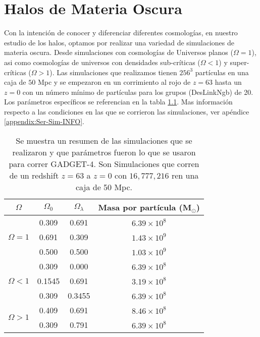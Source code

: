 \chapter{Halos de Materia Oscura}
\setcounter{equation}{0}

\noindent Con la intención de conocer y diferenciar diferentes cosmologías, en nuestro estudio de los halos, optamos por realizar una variedad de simulaciones de materia oscura. Desde simulaciones con cosmologías de Universos planos ($\Omega = 1$), asi como cosmologías  de universos con densidades sub-críticas ($\Omega < 1$) y super-críticas ($\Omega > 1$). Las simulaciones que realizamos tienen $256^3$ partículas en una caja de $50$ Mpc y se empezaron en un corrimiento al rojo de $z=63$ hasta un $z=0$ con un número mínimo de partículas para los grupos (DesLinkNgb) de 20. Los parámetros específicos se referencian en la tabla \ref{tab:Resumen_Sim}. Mas información respecto a las condiciones en las que se corrieron las simulaciones, ver apéndice \ref{appendix:Ser-Sim-INFO}.


\begin{table}[H]
    \centering
    \begin{tabular}{|c|c|c|c|}
    
        \hline
        $\Omega$ & $\Omega_0$ & $\Omega_\lambda$ & Masa por partícula (M$_\odot$) \\ \hline
        \multirow{3}{*}{$\Omega = 1$} & 0.309 & 0.691 & $6.39 \times 10^8$ \\ \cline{2-4} 
         & 0.691 & 0.309 & $1.43 \times 10^9$ \\ \cline{2-4} 
         & 0.500 & 0.500 & $1.03 \times 10^9$ \\ \hline
        \multirow{3}{*}{$\Omega < 1$} & 0.309 & 0.000 & $6.39 \times 10^8$ \\ \cline{2-4} 
         & 0.1545 & 0.691 & $3.19 \times 10^8$ \\ \cline{2-4} 
         & 0.309 & 0.3455 & $6.39 \times 10^8$ \\ \hline
        \multirow{2}{*}{$\Omega > 1$} & 0.409 & 0.691 & $8.46 \times 10^8$ \\ \cline{2-4} 
         & 0.309 & 0.791 & $6.39 \times 10^8$ \\ \hline
    
    \end{tabular}
    
    \caption{Se muestra un resumen de las simulaciones que se realizaron y que parámetros fueron lo que se usaron para correr GADGET-4. Son Simulaciones que corren de un redshift $z=63$ a $z=0$ con $16,777,216$ ren una caja de 50 Mpc.}
    
    \label{tab:Resumen_Sim}

\end{table}


